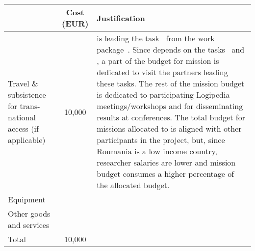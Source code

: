 \begin{longtable*}{|p{.25\textwidth}|c|p{0.55\textwidth}|}
\hline
   & Cost (EUR)  & Justification \\
  \hline
  Travel \& subsistence for trans-national access (if applicable) & 10,000 &

   is leading the task~ from the
work package~.
Since  depends on the
tasks~ and ,
a part of the budget for mission is dedicated to visit the partners leading
these tasks.  The rest of the mission budget is dedicated to
 participating Logipedia meetings/workshops
 and for disseminating results at conferences.
 The total budget for missions allocated to
 is aligned with other participants in the
project, but, since Roumania is a low income country, researcher salaries
are lower and mission budget consumes a higher percentage of the
allocated budget.
  \\
  \hline
  Equipment & & \\
  \hline
  Other goods and services & & \\
  \hline
  Total & 10,000 & \\
  \hline
\end{longtable*}


